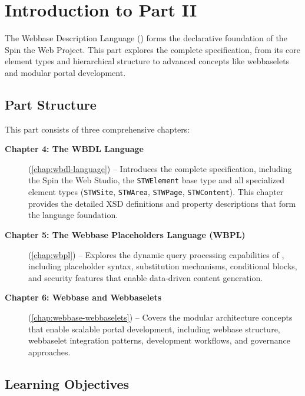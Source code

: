 
\chapter*{Introduction to Part II}

The Webbase Description Language (\wbdl{}) forms the declarative foundation of the Spin the Web Project. This part explores the complete \wbdl{} specification, from its core element types and hierarchical structure to advanced concepts like webbaselets and modular portal development.

\section*{Part Structure}

This part consists of three comprehensive chapters:

\begin{description}
\item[\textbf{Chapter 4: The WBDL Language}] (\cref{chap:wbdl-language}) -- Introduces the complete \wbdl{} specification, including the Spin the Web Studio, the \texttt{STWElement} base type and all specialized element types (\texttt{STWSite}, \texttt{STWArea}, \texttt{STWPage}, \texttt{STWContent}). This chapter provides the detailed XSD definitions and property descriptions that form the language foundation.

\item[\textbf{Chapter 5: The Webbase Placeholders Language (WBPL)}] (\cref{chap:wbpl}) -- Explores the dynamic query processing capabilities of \wbpl{}, including placeholder syntax, substitution mechanisms, conditional blocks, and security features that enable data-driven content generation.

\item[\textbf{Chapter 6: Webbase and Webbaselets}] (\cref{chap:webbase-webbaselets}) -- Covers the modular architecture concepts that enable scalable portal development, including webbase structure, webbaselet integration patterns, development workflows, and governance approaches.
\end{description}

\section*{Learning Objectives}

